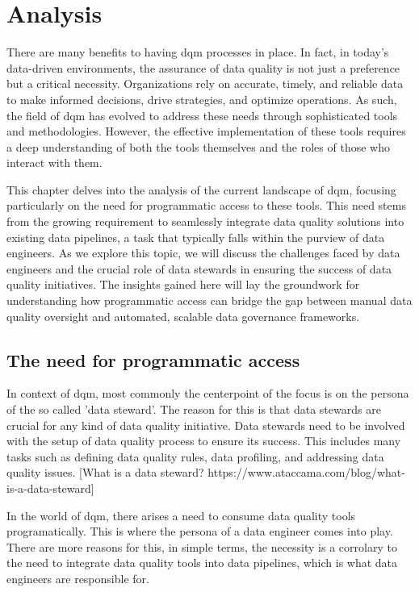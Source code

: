 \chapter{Analysis}
There are many benefits to having \acrfull{dqm} processes in place. In fact, in today's data-driven environments, the assurance of data quality is not just a preference but a critical necessity. Organizations rely on accurate, timely, and reliable data to make informed decisions, drive strategies, and optimize operations. As such, the field of \acrshort{dqm} has evolved to address these needs through sophisticated tools and methodologies. However, the effective implementation of these tools requires a deep understanding of both the tools themselves and the roles of those who interact with them.


This chapter delves into the analysis of the current landscape of \acrshort{dqm}, focusing particularly on the need for programmatic access to these tools. This need stems from the growing requirement to seamlessly integrate data quality solutions into existing data pipelines, a task that typically falls within the purview of data engineers. As we explore this topic, we will discuss the challenges faced by data engineers and the crucial role of data stewards in ensuring the success of data quality initiatives. The insights gained here will lay the groundwork for understanding how programmatic access can bridge the gap between manual data quality oversight and automated, scalable data governance frameworks.


\section{The need for programmatic access}

In context of \acrshort{dqm}, most commonly the centerpoint of the focus is on the persona of the so called 'data steward'. The reason for this is that data stewards are crucial
for any kind of data quality initiative. Data stewards need to be involved with the setup of data quality process to ensure its success. This includes many tasks such as defining data quality rules,
data profiling, and addressing data quality issues. [What is a data steward? https://www.ataccama.com/blog/what-is-a-data-steward]

In the world of \acrshort{dqm}, there arises a need to consume data quality tools programatically. This is where the persona of a data engineer comes into play. There are more reasons for this, in simple terms,
the necessity is a corrolary to the need to integrate data quality tools into data pipelines, which is what data engineers are responsible for.

